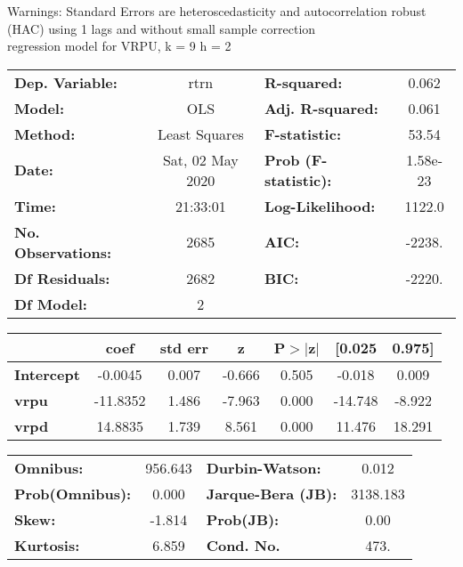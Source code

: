 Warnings: \newline
 [1] Standard Errors are heteroscedasticity and autocorrelation robust (HAC) using 1 lags and without small sample correction\\ 

regression model for VRPU, k = 9 h = 2\begin{center}
\begin{tabular}{lclc}
\toprule
\textbf{Dep. Variable:}    &       rtrn       & \textbf{  R-squared:         } &     0.062   \\
\textbf{Model:}            &       OLS        & \textbf{  Adj. R-squared:    } &     0.061   \\
\textbf{Method:}           &  Least Squares   & \textbf{  F-statistic:       } &     53.54   \\
\textbf{Date:}             & Sat, 02 May 2020 & \textbf{  Prob (F-statistic):} &  1.58e-23   \\
\textbf{Time:}             &     21:33:01     & \textbf{  Log-Likelihood:    } &    1122.0   \\
\textbf{No. Observations:} &        2685      & \textbf{  AIC:               } &    -2238.   \\
\textbf{Df Residuals:}     &        2682      & \textbf{  BIC:               } &    -2220.   \\
\textbf{Df Model:}         &           2      & \textbf{                     } &             \\
\bottomrule
\end{tabular}
\begin{tabular}{lcccccc}
                   & \textbf{coef} & \textbf{std err} & \textbf{z} & \textbf{P$> |$z$|$} & \textbf{[0.025} & \textbf{0.975]}  \\
\midrule
\textbf{Intercept} &      -0.0045  &        0.007     &    -0.666  &         0.505        &       -0.018    &        0.009     \\
\textbf{vrpu}      &     -11.8352  &        1.486     &    -7.963  &         0.000        &      -14.748    &       -8.922     \\
\textbf{vrpd}      &      14.8835  &        1.739     &     8.561  &         0.000        &       11.476    &       18.291     \\
\bottomrule
\end{tabular}
\begin{tabular}{lclc}
\textbf{Omnibus:}       & 956.643 & \textbf{  Durbin-Watson:     } &    0.012  \\
\textbf{Prob(Omnibus):} &   0.000 & \textbf{  Jarque-Bera (JB):  } & 3138.183  \\
\textbf{Skew:}          &  -1.814 & \textbf{  Prob(JB):          } &     0.00  \\
\textbf{Kurtosis:}      &   6.859 & \textbf{  Cond. No.          } &     473.  \\
\bottomrule
\end{tabular}
\end{center}

